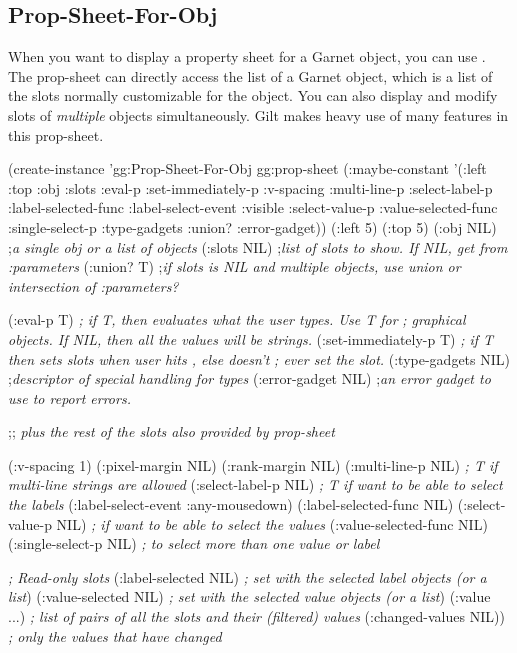 \begin{group}
\subsection{Prop-Sheet-For-Obj}
\label{propsheetforobj}

When you want to display a property sheet for a Garnet object, you can
use .  The prop-sheet can directly access the
 list of a Garnet object, which is a list of the slots
normally customizable for the object.  You can also display and modify
slots of {\it multiple} objects simultaneously.  Gilt makes heavy use of
many features in this prop-sheet.

\begin{programexample}
(create-instance 'gg:Prop-Sheet-For-Obj gg:prop-sheet
    (:maybe-constant '(:left :top :obj :slots :eval-p :set-immediately-p
		       :v-spacing :multi-line-p :select-label-p
		       :label-selected-func :label-select-event :visible
		       :select-value-p :value-selected-func :single-select-p
		       :type-gadgets :union? :error-gadget))
    (:left 5)
    (:top 5)
    (:obj NIL)   ;{\it  a single obj or a list of objects}
    (:slots NIL) ;{\it  list of slots to show. If NIL, get from :parameters}
    (:union? T)  ;{\it if slots is NIL and multiple objects, use union or intersection of :parameters?}

    (:eval-p T)  {\it ; if T, then evaluates what the user types.  Use T for}
		 {\it ; graphical objects.  If NIL, then all the values will be strings.}
    (:set-immediately-p T) {\it ; if T then sets slots when user hits , else doesn't}
			   {\it ; ever set the slot.}
    (:type-gadgets NIL) ;{\it  descriptor of special handling for types}
    (:error-gadget NIL) ;{\it  an error gadget to use to report errors.}

    ;; {\it plus the rest of the slots also provided by prop-sheet}

    (:v-spacing 1)
    (:pixel-margin NIL)
    (:rank-margin NIL)
    (:multi-line-p NIL)    {\it ; T if multi-line strings are allowed}
    (:select-label-p NIL)  {\it ; T if want to be able to select the labels}
    (:label-select-event :any-mousedown)
    (:label-selected-func NIL)
    (:select-value-p NIL)  {\it ; if want to be able to select the values}
    (:value-selected-func NIL)
    (:single-select-p NIL) {\it ; to select more than one value or label}

   {\it ; Read-only slots}
    (:label-selected NIL)  {\it ; set with the selected label objects (or a list})
    (:value-selected NIL)  {\it ; set with the selected value objects (or a list})
    (:value ...)  {\it ; list of pairs of all the slots and their (filtered) values}
    (:changed-values NIL)) {\it ; only the values that have changed}
\end{programexample}
\end{group}



